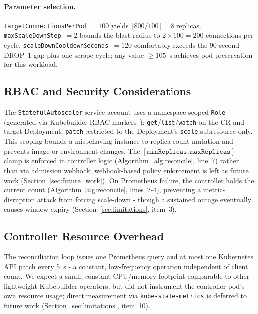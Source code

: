 \documentclass[3p,twocolumn]{elsarticle}
\theoremstyle{plain}%
\theoremstyle{definition}%
\begin{document}
\paragraph{Parameter selection.}
\texttt{targetConnectionsPerPod}~$= 100$ yields $\lceil800/100\rceil = 8$ replicas. \texttt{maxScaleDownStep}~$= 2$ bounds the blast radius to $2 \times 100 = 200$ connections per cycle. \texttt{scaleDownCooldownSeconds}~$= 120$ comfortably exceeds the 90-second DROP~1 gap plus one scrape cycle; any value $\geq 105$~s achieves pod-preservation for this workload.

\subsection{RBAC and Security Considerations}
\label{sec:rbac}

The \texttt{StatefulAutoscaler} service account uses a namespace-scoped \texttt{Role} (generated via Kubebuilder RBAC markers~\cite{kubebuilder_docs}): \texttt{get}/\texttt{list}/\texttt{watch} on the CR and target Deployment; \texttt{patch} restricted to the Deployment's \texttt{scale} subresource only. This scoping bounds a misbehaving instance to replica-count mutation and prevents image or environment changes. The $[\texttt{minReplicas}, \texttt{maxReplicas}]$ clamp is enforced in controller logic (Algorithm~\ref{alg:reconcile}, line~7) rather than via admission webhook; webhook-based policy enforcement is left as future work (Section~\ref{sec:future_work}). On Prometheus failure, the controller holds the current count (Algorithm~\ref{alg:reconcile}, lines~2-4), preventing a metric-disruption attack from forcing scale-down - though a sustained outage eventually causes window expiry (Section~\ref{sec:limitations}, item~3).

\subsection{Controller Resource Overhead}
\label{sec:overhead}

The reconciliation loop issues one Prometheus query and at most one Kubernetes API patch every 5~s - a constant, low-frequency operation independent of client count. We expect a small, constant CPU/memory footprint comparable to other lightweight Kubebuilder operators, but did not instrument the controller pod's own resource usage; direct measurement via \texttt{kube-state-metrics} is deferred to future work (Section~\ref{sec:limitations}, item~10).
\end{document}
